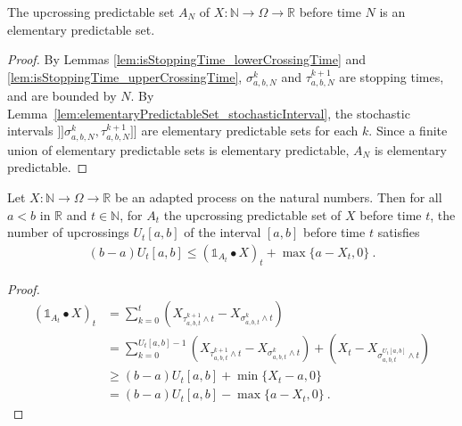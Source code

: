 \begin{lemma}\label{lem:elementaryPredictableSet_upcrossingPredictableSet}
The upcrossing predictable set $A_N$ of $X : \mathbb{N} \to \Omega \to \mathbb{R}$ before time $N$ is an elementary predictable set.
\end{lemma}

\begin{proof}
By Lemmas \ref{lem:isStoppingTime_lowerCrossingTime} and \ref{lem:isStoppingTime_upperCrossingTime}, $\sigma^k_{a, b, N}$ and $\tau^{k+1}_{a, b, N}$ are stopping times, and are bounded by $N$.
By Lemma~\ref{lem:elementaryPredictableSet_stochasticInterval}, the stochastic intervals $]\!]\sigma^k_{a, b, N}, \tau^{k+1}_{a, b, N}]\!]$ are elementary predictable sets for each $k$.
Since a finite union of elementary predictable sets is elementary predictable, $A_N$ is elementary predictable.
\end{proof}


\begin{lemma}\label{lem:upcrossing_simpleProcess_le_nat}
Let $X : \mathbb{N} \to \Omega \to \mathbb{R}$ be an adapted process on the natural numbers.
Then for all $a < b$ in $\mathbb{R}$ and $t \in \mathbb{N}$, for $A_t$ the upcrossing predictable set of $X$ before time $t$, the number of upcrossings $U_t[a, b]$ of the interval $[a, b]$ before time $t$ satisfies
\begin{align*}
  (b - a) U_t[a, b] \le (\mathbb{1}_{A_t} \bullet X)_t + \max\{a - X_t, 0\}
  \:.
\end{align*}
\end{lemma}

\begin{proof}
\begin{align*}
  (\mathbb{1}_{A_t} \bullet X)_t
  &= \sum_{k=0}^t (X_{\tau^{k+1}_{a, b, t} \wedge t} - X_{\sigma^k_{a, b, t} \wedge t})
  \\
  &= \sum_{k=0}^{U_t[a, b]-1} (X_{\tau^{k+1}_{a, b, t} \wedge t} - X_{\sigma^k_{a, b, t} \wedge t})
    + (X_t - X_{\sigma^{U_t[a, b]}_{a, b, t} \wedge t})
  \\
  &\ge (b - a) U_t[a, b] + \min\{X_t - a, 0\}
  \\
  &= (b - a) U_t[a, b] - \max\{a - X_t, 0\}
  \: .
\end{align*}
\end{proof}

